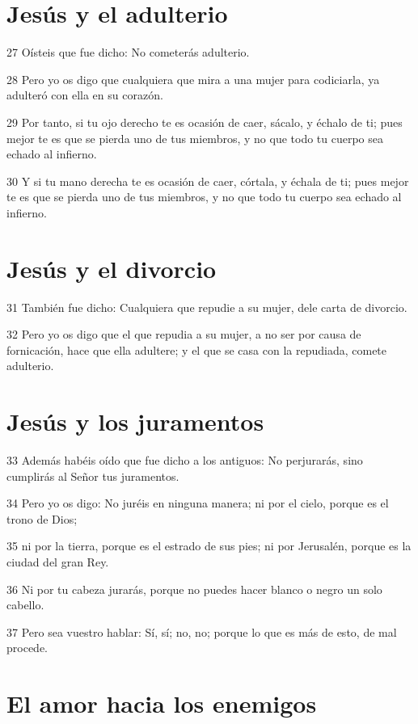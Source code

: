 \section*{Jesús y el adulterio}

\par 27 Oísteis que fue dicho: No cometerás adulterio.
\par 28 Pero yo os digo que cualquiera que mira a una mujer para codiciarla, ya adulteró con ella en su corazón.
\par 29 Por tanto, si tu ojo derecho te es ocasión de caer, sácalo, y échalo de ti; pues mejor te es que se pierda uno de tus miembros, y no que todo tu cuerpo sea echado al infierno.
\par 30 Y si tu mano derecha te es ocasión de caer, córtala, y échala de ti; pues mejor te es que se pierda uno de tus miembros, y no que todo tu cuerpo sea echado al infierno.

\section*{Jesús y el divorcio}

\par 31 También fue dicho: Cualquiera que repudie a su mujer, dele carta de divorcio.
\par 32 Pero yo os digo que el que repudia a su mujer, a no ser por causa de fornicación, hace que ella adultere; y el que se casa con la repudiada, comete adulterio.

\section*{Jesús y los juramentos}

\par 33 Además habéis oído que fue dicho a los antiguos: No perjurarás, sino cumplirás al Señor tus juramentos.
\par 34 Pero yo os digo: No juréis en ninguna manera; ni por el cielo, porque es el trono de Dios;
\par 35 ni por la tierra, porque es el estrado de sus pies; ni por Jerusalén, porque es la ciudad del gran Rey.
\par 36 Ni por tu cabeza jurarás, porque no puedes hacer blanco o negro un solo cabello.
\par 37 Pero sea vuestro hablar: Sí, sí; no, no; porque lo que es más de esto, de mal procede.

\section*{El amor hacia los enemigos}

